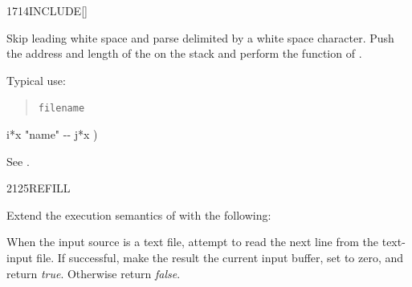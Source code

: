 \begin{worddef}{1714}{INCLUDE}[]%
\item {}

	Skip leading white space and parse  delimited by a
	white space character. Push the address and length of the
	 on the stack and perform the function of
	.


	\begin{rationale} %
		Typical use:
		\begin{quote}
			 \texttt{filename}
		\end{quote}
	\end{rationale}

	\begin{implement} %
		\word{:}   i*x "name" -{}- j*x ) \\
		\tab {}  \word{;}
	\end{implement}

	\begin{testing} %
		See .
	\end{testing}
\end{worddef}


\begin{worddef}{2125}{REFILL}
\item {}

	Extend the execution semantics of 
	with the following:

	When the input source is a text file, attempt to read the next
	line from the text-input file. If successful, make the result
	the current input buffer, set  to zero, and
	return \emph{true}. Otherwise return \emph{false}.

\end{worddef}


